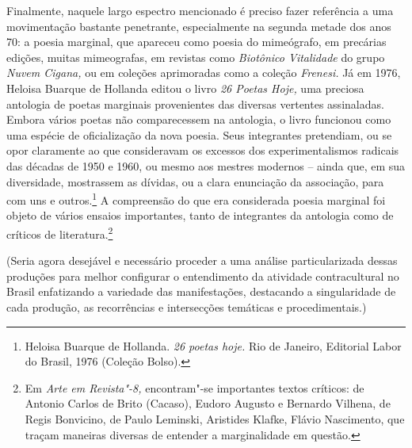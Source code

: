 Finalmente, naquele largo espectro mencionado é preciso fazer referência
a uma movimentação bastante penetrante, especialmente na segunda metade
dos anos 70: a poesia marginal, que apareceu como poesia do mimeógrafo,
em precárias edições, muitas mimeografas, em revistas como %
\emph{Biotônico Vitalidade} do grupo \emph{Nuvem Cigana,} ou em coleções
aprimoradas como a coleção \emph{Frenesi.} Já em 1976, Heloisa Buarque
de Hollanda editou o livro \emph{26 Poetas Hoje,} uma preciosa antologia
de poetas marginais provenientes das diversas vertentes assinaladas.
Embora vários poetas não comparecessem na antologia, o livro funcionou
como uma espécie de oficialização da nova poesia. Seus integrantes
pretendiam, ou se opor claramente ao que consideravam os excessos dos
experimentalismos radicais das décadas de 1950 e 1960, ou mesmo aos
mestres modernos -- ainda que, em sua diversidade, mostrassem as
dívidas, ou a clara enunciação da associação, para com uns e
outros.\footnote{Heloisa Buarque de Hollanda. \emph{26 poetas hoje.} Rio
  de Janeiro, Editorial Labor do Brasil, 1976 (Coleção Bolso).} A
compreensão do que era considerada poesia marginal foi objeto de vários
ensaios importantes, tanto de integrantes da antologia como de críticos
de literatura.\footnote{Em \emph{Arte em Revista"-8,} encontram"-se
  importantes textos críticos: de Antonio Carlos de Brito (Cacaso),
  Eudoro Augusto e Bernardo Vilhena, de Regis Bonvicino, de Paulo
  Leminski, Aristides Klafke, Flávio Nascimento, que traçam maneiras
  diversas de entender a marginalidade em questão.}

\asterisc

(Seria agora desejável e necessário proceder a uma análise
particularizada dessas produções para melhor configurar o entendimento
da atividade contracultural no Brasil enfatizando a variedade das
manifestações, destacando a singularidade de cada produção, as
recorrências e intersecções temáticas e procedimentais.)

\paginabranca
\movetooddpage
\thispagestyle{empty}
\setcounter{footnote}{0}
\begin{vplace}[0.25]

{\large{}}
\end{vplace}

\pagebreak
\thispagestyle{empty}

\movetooddpage


